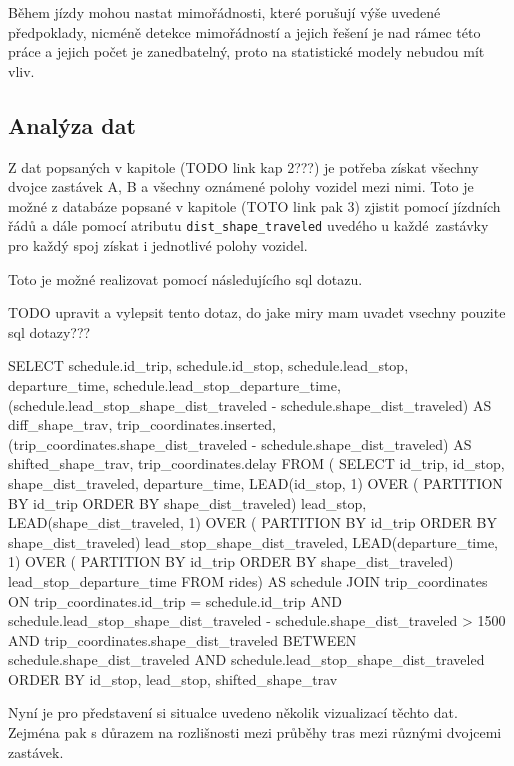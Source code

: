 \bigbreak

Během jízdy mohou nastat mimořádnosti, které porušují výše uvedené předpoklady, nicméně detekce mimořádností a jejich řešení je nad rámec této práce a jejich počet je zanedbatelný, proto na statistické modely nebudou mít vliv.


\subsection{Analýza dat}

Z dat popsaných v kapitole (TODO link kap 2???) je potřeba získat všechny dvojce zastávek A, B a všechny oznámené polohy vozidel mezi nimi. Toto je možné z databáze popsané v kapitole (TOTO link pak 3) zjistit pomocí jízdních řádů a dále pomocí atributu \verb-dist_shape_traveled- uvedého u každé zastávky pro každý spoj získat i jednotlivé polohy vozidel.

\bigbreak

Toto je možné realizovat pomocí následujícího \gls{sql} dotazu.

TODO upravit a vylepsit tento dotaz, do jake miry mam uvadet vsechny pouzite sql dotazy???
\begin{code}[frame=none]
SELECT schedule.id_trip,
	schedule.id_stop,
	schedule.lead_stop,
	departure_time,
	schedule.lead_stop_departure_time,
	(schedule.lead_stop_shape_dist_traveled - schedule.shape_dist_traveled)
		AS diff_shape_trav,
	trip_coordinates.inserted,
	(trip_coordinates.shape_dist_traveled - schedule.shape_dist_traveled)
		AS shifted_shape_trav,
	trip_coordinates.delay
FROM (
	SELECT id_trip, id_stop, shape_dist_traveled, departure_time,
		LEAD(id_stop, 1) OVER (
			PARTITION BY id_trip ORDER BY shape_dist_traveled) lead_stop,
		LEAD(shape_dist_traveled, 1) OVER (
			PARTITION BY id_trip ORDER BY shape_dist_traveled) lead_stop_shape_dist_traveled,
		LEAD(departure_time, 1) OVER (
			PARTITION BY id_trip ORDER BY shape_dist_traveled) lead_stop_departure_time
	FROM rides) AS schedule
JOIN trip_coordinates
ON trip_coordinates.id_trip = schedule.id_trip AND
	schedule.lead_stop_shape_dist_traveled - schedule.shape_dist_traveled > 1500 AND
	trip_coordinates.shape_dist_traveled BETWEEN schedule.shape_dist_traveled AND
	schedule.lead_stop_shape_dist_traveled
ORDER BY id_stop, lead_stop, shifted_shape_trav
\end{code}

\bigbreak

Nyní je pro představení si situalce uvedeno několik vizualizací těchto dat. Zejména pak s důrazem na rozlišnosti mezi průběhy tras mezi různými dvojcemi zastávek.

